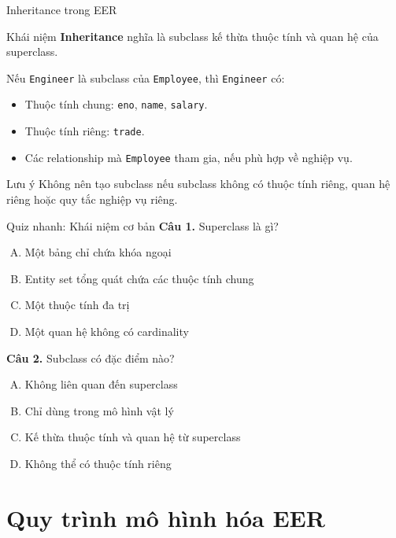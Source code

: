 \documentclass[aspectratio=169,11pt]{beamer}
\newcommand{\concept}[1]{\textcolor{NEUBlue}{\textbf{#1}}}
\newcommand{\codeword}[1]{\texttt{#1}}
\begin{document}
\begin{frame}{Inheritance trong EER}
\begin{block}{Khái niệm}
\concept{Inheritance} nghĩa là subclass kế thừa thuộc tính và quan hệ của superclass.
\end{block}

Nếu \codeword{Engineer} là subclass của \codeword{Employee}, thì \codeword{Engineer} có:
\begin{itemize}
    \item Thuộc tính chung: \codeword{eno}, \codeword{name}, \codeword{salary}.
    \item Thuộc tính riêng: \codeword{trade}.
    \item Các relationship mà \codeword{Employee} tham gia, nếu phù hợp về nghiệp vụ.
\end{itemize}

\begin{alertblock}{Lưu ý}
Không nên tạo subclass nếu subclass không có thuộc tính riêng, quan hệ riêng hoặc quy tắc nghiệp vụ riêng.
\end{alertblock}
\end{frame}

\begin{frame}{Quiz nhanh: Khái niệm cơ bản}
\textbf{Câu 1.} Superclass là gì?
\begin{enumerate}[A.]
    \item Một bảng chỉ chứa khóa ngoại
    \item Entity set tổng quát chứa các thuộc tính chung
    \item Một thuộc tính đa trị
    \item Một quan hệ không có cardinality
\end{enumerate}
\vspace{0.2cm}
\textbf{Câu 2.} Subclass có đặc điểm nào?
\begin{enumerate}[A.]
    \item Không liên quan đến superclass
    \item Chỉ dùng trong mô hình vật lý
    \item Kế thừa thuộc tính và quan hệ từ superclass
    \item Không thể có thuộc tính riêng
\end{enumerate}
\end{frame}

\section{Quy trình mô hình hóa EER}
\end{document}
